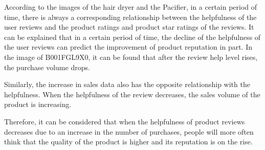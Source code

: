 \documentclass[12pt]{article}
\begin{document}
According to the images of the hair dryer and the Pacifier, in a certain period of time, there is always a corresponding relationship between the helpfulness of the user reviews and the product ratings and product star ratings of the reviews. It can be explained that in a certain period of time, the decline of the helpfulness of the user reviews can predict the improvement of product reputation in part. In the image of B001FGL9X0, it can be found that after the review help level rises, the purchase volume drops.
\par\par\quad\par\quad\par\quad\par\quad\par\quad\par\quad\par\quad\par\quad\par\quad\par\quad\par
Similarly, the increase in sales data also has the opposite relationship with the helpfulness. When the helpfulness of the review decreases, the sales volume of the product is increasing.
\par
Therefore, it can be considered that when the helpfulness of product reviews decreases due to an increase in the number of purchases, people will more often think that the quality of the product is higher and its reputation is on the rise.
\end{document}
